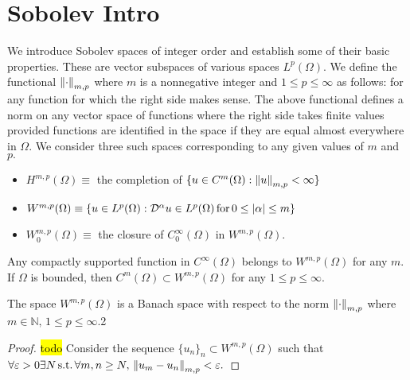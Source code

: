 \section{Sobolev Intro}
We introduce Sobolev spaces of integer order and establish some of their basic properties. These are vector subspaces of various spaces $L^p(\Omega).$ We define the functional $\norm{\cdot}_{m,p}$ where $m$ is a nonnegative integer and $1\leq p\leq \infty$ as follows:
for any function for which the right side makes sense. The above functional defines a norm on any vector space of functions where the right side takes finite values provided functions are identified in the space if they are equal almost everywhere in $\Omega.$ We consider three such spaces corresponding to any given values of $m$ and $p.$
\begin{itemize}
    \item $H^{m,p}(\Omega)\equiv$ the completion of $\{u\in C^m(\Omega):\norm{u}_{m,p}<\infty\}$
    \item $W^{m,p}(\Omega)\equiv\{u\in L^p(\Omega):\mathcal{D}^\alpha u\in L^p(\Omega)\,\mathrm{for}\,0\leq\abs{\alpha}\leq m\}$
    \item $W_0^{m,p}(\Omega)\equiv$ the closure of $C_0^\infty(\Omega)$ in $W^{m,p}(\Omega).$
\end{itemize}
Any compactly supported function in $C^\infty(\Omega)$ belongs to $W^{m,p}(\Omega)$ for any $m.$ If $\Omega$ is bounded, then $C^{m}(\Omega)\subset W^{m,p}(\Omega)$ for any $1\leq p\leq\infty.$
\begin{theorem}
    The space $W^{m,p}(\Omega)$ is a Banach space with respect to the norm $\norm{\cdot}_{m,p}$ where $m\in\mathbb{N},\,1\leq p\leq\infty.$2
\end{theorem}
\begin{proof}
    \hl{todo}
    Consider the sequence $\{u_n\}_n\subset W^{m,p}(\Omega)$ such that $\forall\varepsilon>0\exists N\,\mathrm{s.t.}\,\forall m,n\geq N,\,\norm{u_m-u_n}_{m,p}<\varepsilon.$
\end{proof}

